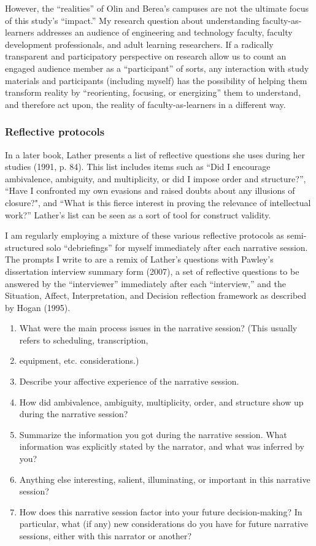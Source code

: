 However, the “realities” of Olin and Berea’s campuses are not the ultimate focus of this study’s “impact.” My research question about understanding faculty-as-learners addresses an audience of engineering and technology faculty, faculty development professionals, and adult learning researchers. If a radically transparent and participatory perspective on research allow us to count an engaged audience member as a “participant” of sorts, any interaction with study materials and participants (including myself) has the possibility of helping them transform reality by “reorienting, focusing, or energizing” them to understand, and therefore act upon, the reality of faculty-as-learners in a different way.

\subsubsection{Reflective protocols}

In a later book, Lather presents a list of reflective questions she uses during her studies (1991, p. 84). This list includes items such as “Did I encourage ambivalence, ambiguity, and multiplicity, or did I impose order and structure?”, “Have I confronted my own evasions and raised doubts about any illusions of closure?", and “What is this fierce interest in proving the relevance of intellectual work?” Lather’s list can be seen as a sort of tool for construct validity. 

I am regularly employing a mixture of these various reflective protocols as semi-structured solo “debriefings” for myself immediately after each narrative session. The prompts I write to are a remix of Lather’s questions with Pawley’s dissertation interview summary form (2007), a set of reflective questions to be answered by the “interviewer” immediately after each “interview,” and the Situation, Affect, Interpretation, and Decision reflection framework as described by Hogan (1995). 

\begin{enumerate}
\item What were the main process issues in the narrative session? (This usually refers to scheduling, transcription, \item equipment, etc. considerations.)
\item Describe your affective experience of the narrative session.
\item How did ambivalence, ambiguity, multiplicity, order, and structure show up during the narrative session?
\item Summarize the information you got during the narrative session. What information was explicitly stated by the narrator, and what was inferred by you?
\item Anything else interesting, salient, illuminating, or important in this narrative session?
\item How does this narrative session factor into your future decision-making? In particular, what (if any) new considerations do you have for future narrative sessions, either with this narrator or another?
\end{enumerate}

